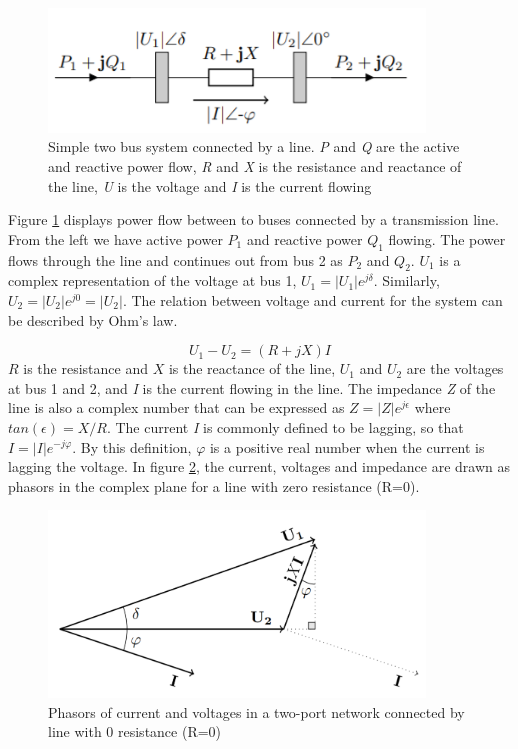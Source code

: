 \documentclass{report}
\begin{document}
\begin{figure}[ht]
    \center
    \includegraphics[width=10cm]{figures/two_bus.PNG}
    \caption[size = 9]
    {Simple two bus system connected by a line. \textit{P} and \textit{Q} are the active and reactive power flow, \textit{R} and \textit{X} is the resistance and reactance of the line, \textit{U} is the voltage and \textit{I} is the current flowing}
	\label{fig:two_bus}
\end{figure}

Figure \ref{fig:two_bus} displays power flow between to buses connected by a transmission line. From the left we have active power $P_{1}$ and reactive power $Q_{1}$ flowing. The power flows through the line and continues out from bus 2 as $P_{2}$ and $Q_{2}$. $U_{1}$ is a complex representation of the voltage at bus 1, $U_{1} = |U_{1}|e^{j\delta}$. Similarly, $U_{2} = |U_{2}|e^{j0} = |U_{2}|$. The relation between voltage and current for the system can be described by Ohm's law.

\begin{equation}\label{eq:chap1_ohm}
    U_{1} - U_{2} = (R + jX)I
\end{equation}
$R$ is the resistance and $X$ is the reactance of the line, $U_{1}$ and $U_{2}$ are the voltages at bus 1 and 2, and \textit{I} is the current flowing in the line. The impedance \textit{Z} of the line is also a complex number that can be expressed as $Z = |Z|e^{j\epsilon}$ where $tan (\epsilon) = X/R$. The current \textit{I} is commonly defined to be lagging, so that $I = |I|e^{-j\varphi}$. By this definition, $\varphi$ is a positive real number when the current is lagging the voltage. In figure \ref{fig:two_bus_phasor}, the current, voltages and impedance are drawn as phasors in the complex plane for a line with zero resistance (R=0).


\begin{figure}[ht!]
    \center
    \includegraphics[width=10cm]{figures/two_bus_phasor.PNG}
    \caption[size = 9]{Phasors of current and voltages in a two-port network connected by line with 0 resistance (R=0)}
	\label{fig:two_bus_phasor}
\end{figure}
\end{document}

